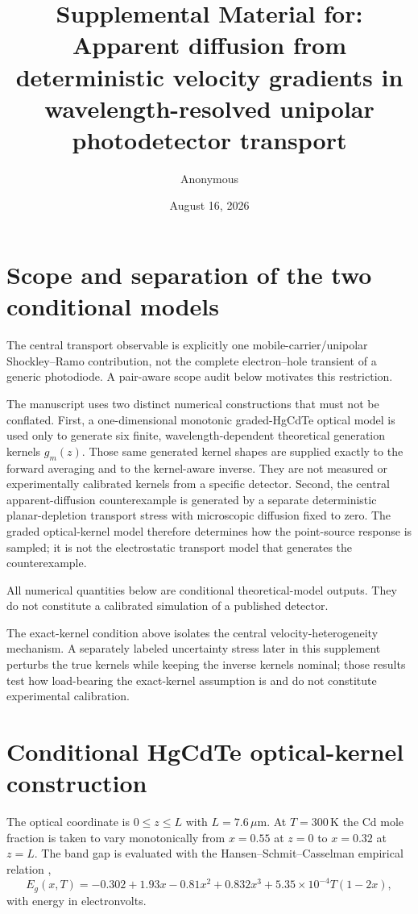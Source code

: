 \documentclass[aps,pra,onecolumn,superscriptaddress,nofootinbib]{revtex4-2}
\begin{document}
\title{Supplemental Material for: Apparent diffusion from deterministic velocity gradients in wavelength-resolved unipolar photodetector transport}
\author{Anonymous}
\date{August 16, 2026}
\maketitle

\section{Scope and separation of the two conditional models}

The central transport observable is explicitly one mobile-carrier/unipolar Shockley--Ramo contribution, not the complete electron--hole transient of a generic photodiode. A pair-aware scope audit below motivates this restriction.

The manuscript uses two distinct numerical constructions that must not be conflated.  First, a one-dimensional monotonic graded-HgCdTe optical model is used only to generate six finite, wavelength-dependent theoretical generation kernels $g_m(z)$.  Those same generated kernel shapes are supplied exactly to the forward averaging and to the kernel-aware inverse.  They are not measured or experimentally calibrated kernels from a specific detector.  Second, the central apparent-diffusion counterexample is generated by a separate deterministic planar-depletion transport stress with microscopic diffusion fixed to zero.  The graded optical-kernel model therefore determines how the point-source response is sampled; it is not the electrostatic transport model that generates the counterexample.

All numerical quantities below are conditional theoretical-model outputs.  They do not constitute a calibrated simulation of a published detector.

The exact-kernel condition above isolates the central velocity-heterogeneity mechanism. A separately labeled uncertainty stress later in this supplement perturbs the true kernels while keeping the inverse kernels nominal; those results test how load-bearing the exact-kernel assumption is and do not constitute experimental calibration.


\section{Conditional HgCdTe optical-kernel construction}

The optical coordinate is $0\le z\le L$ with $L=7.6\,\mu\mathrm{m}$.  At $T=300\,\mathrm{K}$ the Cd mole fraction is taken to vary monotonically from $x=0.55$ at $z=0$ to $x=0.32$ at $z=L$.  The band gap is evaluated with the Hansen--Schmit--Casselman empirical relation \cite{hansen1982gap},
\begin{equation}
E_g(x,T)=-0.302+1.93x-0.81x^2+0.832x^3+5.35\times10^{-4}T(1-2x),
\end{equation}
with energy in electronvolts.
\end{document}
